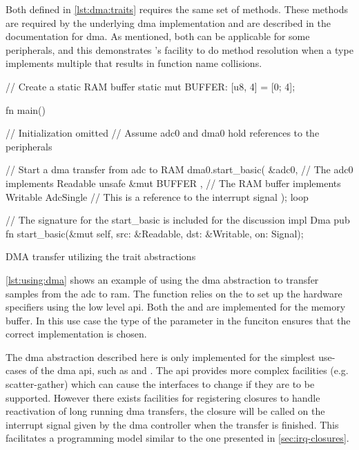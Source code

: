 Both  defined in \autoref{lst:dma:traits} requires the same set of methods.
These methods are required by the underlying \gls{dma} implementation and are described in the {\emlib} documentation for \gls{dma}.
As mentioned, both  can be applicable for some peripherals, and this demonstrates {\rust}'s facility to do method resolution when a type implements multiple  that results in function name collisions.

\begin{listing}[H]
  \begin{rustcode}
// Create a static RAM buffer
static mut BUFFER: [u8, 4] = [0; 4];

fn main() {
  // Initialization omitted
  // Assume adc0 and dma0 hold references to the peripherals

  // Start a dma transfer from adc to RAM
  dma0.start_basic(
    &adc0,                  // The adc0 implements Readable
    unsafe { &mut BUFFER }, // The RAM buffer implements Writable
    AdcSingle               // This is a reference to the interrupt signal
  );
  loop {}
}

// The signature for the start_basic is included for the discussion
impl Dma {
  pub fn start_basic(&mut self, src: &Readable, dst: &Writable, on: Signal);
}
  \end{rustcode}
  \caption{DMA transfer utilizing the trait abstractions}
  \label{lst:using:dma}
\end{listing}

\autoref{lst:using:dma} shows an example of using the \gls{dma} abstraction to transfer samples from the \gls{adc} to \gls{ram}.
The  function relies on the  to set up the hardware specifiers using the low level \gls{api}.
Both the  and   are implemented for the memory buffer.
In this use case the type of the  parameter in the  funciton ensures that the correct implementation is chosen.

The \gls{dma} abstraction described here is only implemented for the simplest use-cases of the {\emlib} \gls{dma} \gls{api}, such as  and .
The {\emlib} \gls{api} provides more complex facilities (e.g. scatter-gather) which can cause the interfaces to change if they are to be supported.
However there exists facilities for registering closures to handle reactivation of long running \gls{dma} transfers, the closure will be called on the interrupt signal given by the \gls{dma} controller when the transfer is finished.
This facilitates a programming model similar to the one presented in \autoref{sec:irq-closures}.
